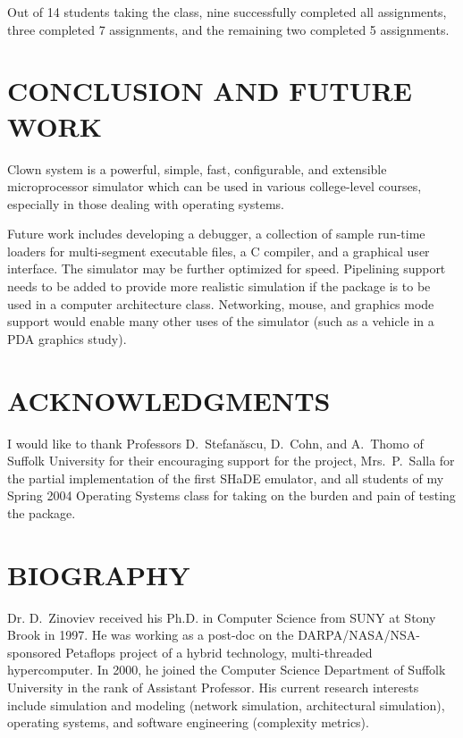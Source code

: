 \documentclass[10pt,twoside]{article}
\begin{document}
Out of 14 students taking the class, nine successfully completed all
assignments, three completed 7 assignments, and the remaining two
completed 5 assignments.

\section{CONCLUSION AND FUTURE WORK}

Clown system is a powerful, simple, fast, configurable, and extensible
microprocessor simulator which can be used in various college-level
courses, especially in those dealing with operating systems.

Future work includes developing a debugger, a collection of sample
run-time loaders for multi-segment executable files, a C compiler, and
a graphical user interface. The simulator may be further optimized for
speed. Pipelining support needs to be added to provide more realistic
simulation if the package is to be used in a computer architecture
class. Networking, mouse, and graphics mode support would enable many
other uses of the simulator (such as a vehicle in a PDA graphics
study).

\section{ACKNOWLEDGMENTS}

I would like to thank Professors D.~Stefan\u{a}scu, D.~Cohn, and
A.~Thomo of Suffolk University for their encouraging support for the
project, Mrs.~P.~Salla for the partial implementation of the first
SHaDE emulator, and all students of my Spring 2004 Operating Systems
class for taking on the burden and pain of testing the package.

\section{BIOGRAPHY}

Dr. D.~Zinoviev received his Ph.D. in Computer Science from SUNY at
Stony Brook in 1997. He was working as a post-doc on the
DARPA/NASA/NSA-sponsored Petaflops project of a hybrid technology,
multi-threaded hypercomputer. In 2000, he joined the Computer Science
Department of Suffolk University in the rank of Assistant
Professor. His current research interests include simulation and
modeling (network simulation, architectural simulation), operating
systems, and software engineering (complexity metrics).



\end{document}
